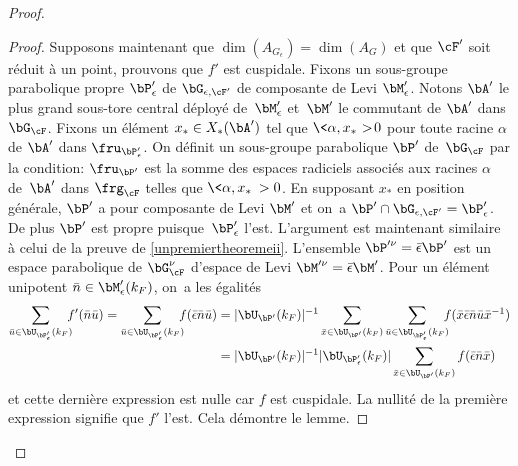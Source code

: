 \begin{proof}
\begin{proof}
Supposons maintenant que $\dim(A_{G_{\epsilon}})=\dim(A_{G})$ et que $\cF'$ soit réduit à un point, prouvons que $f'$ est cuspidale. Fixons un sous-groupe parabolique propre $\bP'_{\epsilon}$ de $\bG_{\epsilon,\cF'}$ de composante de Levi $\bM'_{\epsilon}$. Notons $\bA'$ le plus grand sous-tore central déployé de~$\bM'_{\epsilon}$ et~$\bM'$ le commutant de $\bA'$ dans $\bG_{\cF}$. Fixons un élément $x_{*}\in X_{*}(\bA')$ tel que \hbox{$\<\alpha,x_{*}\>\!>\!0$} pour toute racine $\alpha$ de $\bA'$ dans $\boldsymbol{\fru}_{\bP'_{\epsilon}}$. On définit un sous-groupe parabolique $\bP'$ de~$\bG_{\cF}$ par la condition: $\boldsymbol{\fru}_{\bP'}$ est la somme des espaces radiciels associés aux racines $\alpha$ de~$\bA'$ dans $\boldsymbol{\frg}_{\cF}$ telles que $\<\alpha,x_{*}\>>0$. En supposant $x_{*}$ en position générale, $\bP'$ a pour composante de Levi $\bM'$ et on~a $\bP'\cap \bG_{\epsilon,\cF'}=\bP'_{\epsilon}$. De plus $\bP'$ est propre puisque~$\bP'_{\epsilon}$ l'est. L'argument est maintenant similaire à celui de la preuve de \eqref{unpremiertheoremeii}. L'ensemble $\bP^{\prime\nu}=\bar{\epsilon}\bP'$ est un espace parabolique de $\bG_{\cF}^{\nu}$ d'espace de Levi $\bM^{\prime\nu}=\bar{\epsilon}\bM'$. Pour un élément unipotent $\bar{n}\in \bM'_{\epsilon}(k_{F})$, on~a les égalités\vspace*{-3pt}
\begin{align*}
\sum_{\bar{u}\in \bU_{\bP'_{\epsilon}}(k_{F})}\hspace*{-2mm}f'(\bar{n}\bar{u})=\sum_{\bar{u}\in \bU_{\bP'_{\epsilon}}(k_{F})}\hspace*{-2mm}f(\bar{\epsilon}\bar{n}\bar{u})
&=\vert \bU_{\bP'}(k_{F})\vert ^{-1}\sum_{\bar{x}\in \bU_{\bP'}(k_{F})}\sum_{\bar{u}\in \bU_{\bP'_{\epsilon}}(k_{F})}\hspace*{-2mm}f(\bar{x}\bar{\epsilon}\bar{n}\bar{u}\bar{x}^{-1})\\
&=\vert \bU_{\bP'}(k_{F})\vert ^{-1}\vert \bU_{\bP'_{\epsilon}}(k_{F})\vert \sum_{\bar{x}\in \bU_{\bP'}(k_{F})}f(\bar{\epsilon}\bar{n}\bar{x})
\end{align*}
et cette dernière expression est nulle car $f$ est cuspidale. La nullité de la première expression signifie que $f'$ l'est. Cela démontre le lemme.
\end{proof}


\end{proof}
